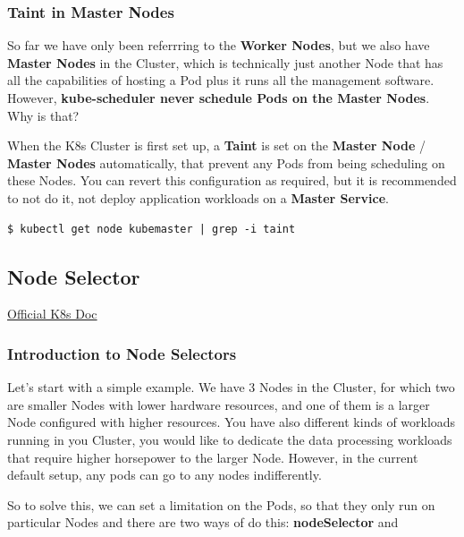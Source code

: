 \documentclass{article}
\newenvironment{codetemplate}[1][]{%
  \mybasecolorbox[#1]
  \itshape
}{%
  \endmybasecolorbox
}
\begin{document}
\subsubsection{Taint in Master Nodes}

So far we have only been referrring to the \textbf{Worker Nodes}, but we also have \textbf{Master Nodes} in the Cluster, which is technically just another Node that has all the capabilities of hosting a Pod plus it runs all the management software. However, \textbf{kube-scheduler never schedule Pods on the Master Nodes}. Why is that?

When the K8s Cluster is first set up, a \textbf{Taint} is set on the \textbf{Master Node} / \textbf{Master Nodes} automatically, that prevent any Pods from being scheduling on these Nodes. You can revert this configuration as required, but it is recommended to not do it, not deploy application workloads on a \textbf{Master Service}.

\begin{codetemplate}{}
\begin{verbatim}
$ kubectl get node kubemaster | grep -i taint
\end{verbatim}
\end{codetemplate}

\subsection{Node Selector}

\href{https://kubernetes.io/docs/concepts/scheduling-eviction/assign-pod-node/}{Official K8s Doc}

\subsubsection{Introduction to Node Selectors}

Let's start with a simple example. We have 3 Nodes in the Cluster, for which two are smaller Nodes with lower hardware resources, and one of them is a larger Node configured with higher resources. You have also different kinds of workloads running in you Cluster, you would like to dedicate the data processing workloads that require higher horsepower to the larger Node. However, in the current default setup, any pods can go to any nodes indifferently.

So to solve this, we can set a limitation on the Pods, so that they only run on particular Nodes and there are two ways of do this: \textbf{nodeSelector} and
\end{document}
